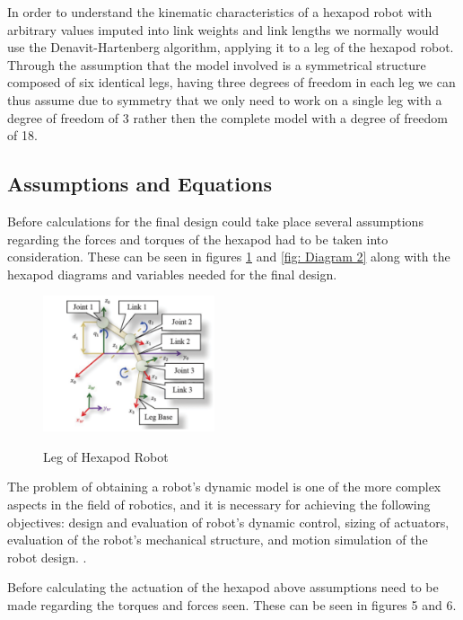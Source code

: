 In order to understand the kinematic characteristics of a hexapod robot with arbitrary values imputed into link weights and link lengths we normally would use the Denavit-Hartenberg algorithm, applying it to a leg of the hexapod robot. Through the assumption that the model involved is a symmetrical structure composed of six identical legs, having three degrees of freedom in each leg we can thus assume due to symmetry that we only need to work on a single leg with a degree of freedom of 3 rather then the complete model with a degree of freedom of 18.



\subsection{Assumptions and Equations}
Before calculations for the final design could take place several assumptions regarding the forces and torques of the hexapod had to be taken into consideration. These can be seen in figures \ref{fig: Diagram 1} and \ref{fig: Diagram 2} along with the hexapod diagrams and variables needed for  the final design.


\begin{figure}[h]

 \centering
   \includegraphics[width = 0.45\textwidth]{figures/11.png}            \caption{Leg of Hexapod Robot}
   \label{fig: Diagram 1}
   \cite{pullteap2013development}
\end{figure}





The problem of obtaining a robot’s dynamic model is one of the more complex aspects in the field of robotics, and it is necessary for achieving the following objectives: design and evaluation of robot’s dynamic control, sizing of actuators, evaluation of the robot’s mechanical structure, and motion simulation of the robot design.  
 \cite{pullteap2013development}.



Before calculating the actuation of the hexapod above assumptions need to be made regarding the torques and forces seen. These can be seen in figures 5 and 6.

